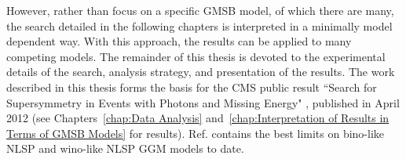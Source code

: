 \documentclass[dissertation.tex]{subfiles}
\begin{document}
However, rather than focus on a specific GMSB model, of which there are many, the search detailed in the following chapters is interpreted in a minimally model dependent way.  With this approach, the results can be applied to many competing models.  The remainder of this thesis is devoted to the experimental details of the search, analysis strategy, and presentation of the results.  The work described in this thesis forms the basis for the CMS public result ``Search for Supersymmetry in Events with Photons and Missing Energy" \cite{CMS-PAS-SUS-12-001}, published in April 2012 (see Chapters~\ref{chap:Data Analysis} and~\ref{chap:Interpretation of Results in Terms of GMSB Models} for results).  Ref. \cite{CMS-PAS-SUS-12-001} contains the best limits on bino-like NLSP and wino-like NLSP GGM models to date.
\end{document}
